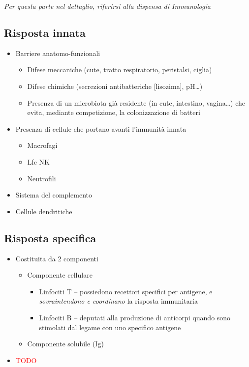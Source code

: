 \documentclass[italian,]{article}
\providecommand{\tightlist}{%
  \setlength{\itemsep}{0pt}\setlength{\parskip}{0pt}}
\newcommand{\TODO}[1]{\textcolor{red}{\textsf{\footnotesize{TODO #1}}}} %
\begin{document}
\emph{Per questa parte nel dettaglio, riferirsi alla dispensa di
Immunologia}

\hypertarget{risposta-innata}{%
\subsection{Risposta innata}\label{risposta-innata}}

\begin{itemize}
\tightlist
\item
  Barriere anatomo-funzionali

  \begin{itemize}
  \tightlist
  \item
    Difese meccaniche (cute, tratto respiratorio, peristalsi, ciglia)
  \item
    Difese chimiche (secrezioni antibatteriche {[}lisozima{]},
    pH\ldots{})
  \item
    Presenza di un microbiota già residente (in cute, intestino,
    vagina\ldots{}) che evita, mediante competizione, la colonizzazione
    di batteri
  \end{itemize}
\item
  Presenza di cellule che portano avanti l'immunità innata

  \begin{itemize}
  \tightlist
  \item
    Macrofagi
  \item
    Lfc NK
  \item
    Neutrofili
  \end{itemize}
\item
  Sistema del complemento
\item
  Cellule dendritiche
\end{itemize}

\hypertarget{risposta-specifica}{%
\subsection{Risposta specifica}\label{risposta-specifica}}

\begin{itemize}
\item
  Costituita da 2 componenti

  \begin{itemize}
  \tightlist
  \item
    Componente cellulare

    \begin{itemize}
    \tightlist
    \item
      Linfociti T -- possiedono recettori specifici per antigene, e
      \emph{sovraintendono e coordinano} la risposta immunitaria
    \item
      Linfociti B -- deputati alla produzione di anticorpi quando sono
      stimolati dal legame con uno specifico antigene
    \end{itemize}
  \item
    Componente solubile (Ig)
  \end{itemize}
\item
  \TODO{}
\end{itemize}
\end{document}
